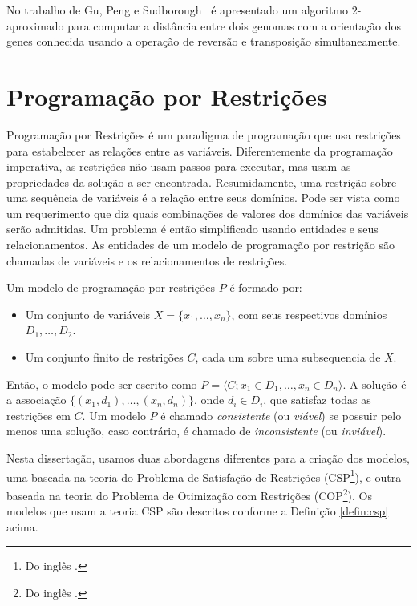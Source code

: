 No trabalho de Gu, Peng e Sudborough~\cite{GuPengSudbourough*1999} é
apresentado um algoritmo $2$-aproximado para computar a distância
entre dois genomas com a orientação dos genes conhecida usando a
operação de reversão e transposição simultaneamente.

\section{Programação por Restrições}
\label{sec:def_cp}
Programação por Restrições é um paradigma de programação que usa
restrições para estabelecer as relações entre as
variáveis. Diferentemente da programação imperativa, as restrições não
usam passos para executar, mas usam as propriedades da solução a ser
encontrada. Resumidamente, uma restrição sobre uma sequência de
variáveis é a relação entre seus domínios. Pode ser vista como um
requerimento que diz quais combinações de valores dos domínios das
variáveis serão admitidas. Um problema é então simplificado usando
entidades e seus relacionamentos. As entidades de um modelo de
programação por restrição são chamadas de variáveis e os
relacionamentos de restrições.

\begin{defin}
\label{defin:csp}
Um modelo de programação por restrições $P$ é formado por:
\begin{itemize}
  \item{Um conjunto de variáveis $X = \{x_{1}, \ldots, x_{n}\}$, com
  seus respectivos domínios $D_{1}, \ldots, D_{2}$.}

  \item{Um conjunto finito de restrições $C$, cada um sobre uma
  subsequencia de $X$.}
\end{itemize}
\end{defin}

Então, o modelo pode ser escrito como $P = \langle C; x_{1} \in
D_{1}, \ldots, x_{n} \in D_{n} \rangle$. A solução é a associação
$\{(x_{1}, d_{1}), \ldots, (x_{n}, d_{n})\}$, onde $d_{i} \in D_{i}$,
que satisfaz todas as restrições em $C$. Um modelo $P$ é
chamado \textit{consistente} (ou \textit{viável}) se possuir pelo
menos uma solução, caso contrário, é chamado de \textit{inconsistente}
(ou \textit{inviável}).

Nesta dissertação, usamos duas abordagens diferentes para a criação
dos modelos, uma baseada na teoria do Problema de Satisfação de
Restrições (CSP\footnote{Do inglês .}), e outra baseada na teoria do Problema de Otimização com
Restrições (COP\footnote{Do inglês .}). Os modelos que usam a teoria CSP são descritos conforme
a Definição \ref{defin:csp} acima.

